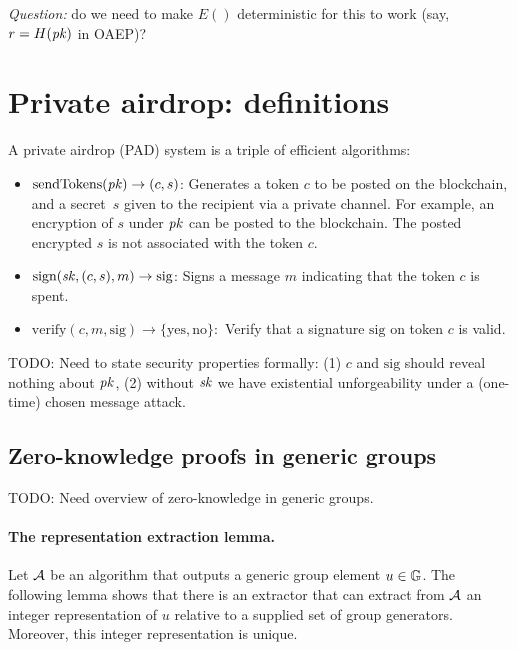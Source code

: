 \documentclass[11pt]{article}
\begin{document}
\emph{Question:} do we need to make $E()$ deterministic for this to work
    (say, $r = H(\mathit{pk})$ in OAEP)?


\section{Private airdrop: definitions}\label{sec:defs}


A private airdrop (PAD) system is a triple of efficient algorithms:
\begin{itemize}
\item $\text{sendTokens}(\mathit{pk}) \to (c, s)$:
Generates a token $c$ to be posted on the blockchain,
and a secret~$s$ given to the recipient via a private channel.
For example, an encryption of $s$ under $\mathit{pk}$ can be posted
to the blockchain.   The posted encrypted $s$ is not associated with 
the token $c$. 

\item $\text{sign}(\mathit{sk}, (c, s), m) \to \text{sig}$:
Signs a message $m$ indicating that the token $c$ is spent.

\item $\text{verify}(c, m, \text{sig}) \to \{\text{yes},\text{no}\}:$
Verify that a signature $\text{sig}$ on token $c$ is valid.
\end{itemize}

TODO: Need to state security properties formally: 
(1) $c$ and $\text{sig}$ should reveal nothing about $\mathit{pk}$,
(2) without $\mathit{sk}$ we have existential unforgeability under a 
(one-time) chosen message attack.


\subsection{Zero-knowledge proofs in generic groups}

TODO: Need overview of zero-knowledge in generic groups. 

\paragraph{The representation extraction lemma.}
Let $\mathcal{A}$ be an algorithm that outputs 
a generic group element $u \in \mathbb G$.
The following lemma shows that there is an extractor that
can extract from $\mathcal{A}$ an integer representation of $u$
relative to a supplied set of group generators.
Moreover, this integer representation is unique.
\end{document}
